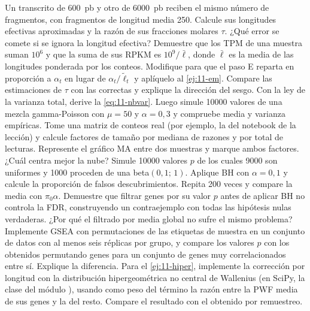 \begin{ejercicios}
 Un transcrito de \SI{600}{pb} y otro de \SI{6000}{pb} reciben el mismo número de fragmentos, con fragmentos de longitud media 250. Calcule sus longitudes efectivas aproximadas y la razón de sus fracciones molares $\tau$. ¿Qué error se comete si se ignora la longitud efectiva?
 Demuestre que los TPM de una muestra suman $10^6$ y que la suma de sus RPKM es $10^9/\bar\ell$, donde $\bar\ell$ es la media de las longitudes ponderada por los conteos.
 Modifique  para que el paso E reparta en proporción a $\alpha_t$ en lugar de $\alpha_t/\tilde\ell_t$ y aplíquelo al \cref{ej:11-em}. Compare las estimaciones de $\tau$ con las correctas y explique la dirección del sesgo.
 Con la ley de la varianza total, derive la \cref{eq:11-nbvar}. Luego simule \num{10000} valores de una mezcla gamma-Poisson con $\mu=50$ y $\alpha=0{,}3$ y compruebe media y varianza empíricas.
 Tome una matriz de conteos real (por ejemplo, la del notebook de la lección) y calcule factores de tamaño por mediana de razones y por total de lecturas. Represente el gráfico MA entre dos muestras y marque ambos factores. ¿Cuál centra mejor la nube?
 Simule \num{10000} valores $p$ de los cuales \num{9000} son uniformes y \num{1000} proceden de una beta$(0{,}1;\,1)$. Aplique BH con $\alpha=0{,}1$ y calcule la proporción de falsos descubrimientos. Repita 200 veces y compare la media con $\pi_0\alpha$.
 Demuestre que filtrar genes por su valor $p$ antes de aplicar BH no controla la FDR, construyendo un contraejemplo con todas las hipótesis nulas verdaderas. ¿Por qué el filtrado por media global no sufre el mismo problema?
 Implemente GSEA con permutaciones de las etiquetas de muestra en un conjunto de datos con al menos seis réplicas por grupo, y compare los valores $p$ con los obtenidos permutando genes para un conjunto de genes muy correlacionados entre sí. Explique la diferencia.
 Para el \cref{ej:11-hiper}, implemente la corrección por longitud con la distribución hipergeométrica no central de Wallenius (en SciPy, la clase  del módulo ), usando como peso del término la razón entre la PWF media de sus genes y la del resto. Compare el resultado con el obtenido por remuestreo.
\end{ejercicios}

